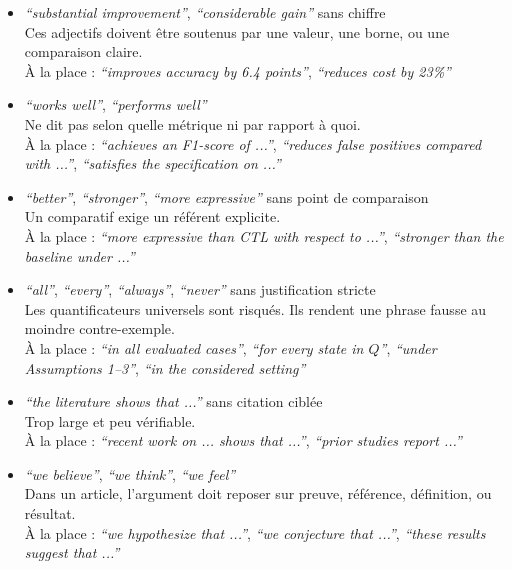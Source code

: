 \documentclass[11pt,a4paper]{article}
\theoremstyle{definition}
\begin{document}
\begin{itemize}
    \item \textit{``substantial improvement''}, \textit{``considerable gain''} sans chiffre \\
    Ces adjectifs doivent être soutenus par une valeur, une borne, ou une comparaison claire. \\
    À la place : \textit{``improves accuracy by 6.4 points''}, \textit{``reduces cost by 23\%''}

    \item \textit{``works well''}, \textit{``performs well''} \\
    Ne dit pas selon quelle métrique ni par rapport à quoi. \\
    À la place : \textit{``achieves an F1-score of ...''}, \textit{``reduces false positives compared with ...''}, \textit{``satisfies the specification on ...''}

    \item \textit{``better''}, \textit{``stronger''}, \textit{``more expressive''} sans point de comparaison \\
    Un comparatif exige un référent explicite. \\
    À la place : \textit{``more expressive than CTL with respect to ...''}, \textit{``stronger than the baseline under ...''}

    \item \textit{``all''}, \textit{``every''}, \textit{``always''}, \textit{``never''} sans justification stricte \\
    Les quantificateurs universels sont risqués. Ils rendent une phrase fausse au moindre contre-exemple. \\
    À la place : \textit{``in all evaluated cases''}, \textit{``for every state in $Q$''}, \textit{``under Assumptions 1--3''}, \textit{``in the considered setting''}

    \item \textit{``the literature shows that ...''} sans citation ciblée \\
    Trop large et peu vérifiable. \\
    À la place : \textit{``recent work on ... shows that ...''}, \textit{``prior studies \cite{...,...} report ...''}

    \item \textit{``we believe''}, \textit{``we think''}, \textit{``we feel''} \\
    Dans un article, l'argument doit reposer sur preuve, référence, définition, ou résultat. \\
    À la place : \textit{``we hypothesize that ...''}, \textit{``we conjecture that ...''}, \textit{``these results suggest that ...''}


\end{itemize}
\end{document}
